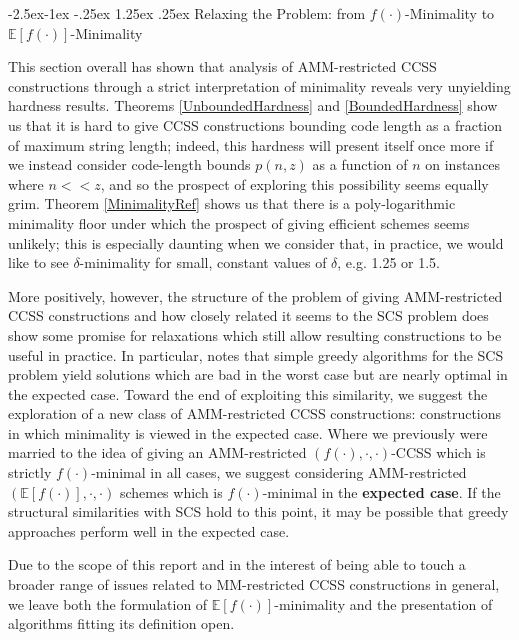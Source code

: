 \documentclass{article}
\makeatletter
\renewcommand\paragraph{\@startsection{paragraph}{4}{\z@}%
            {-2.5ex\@plus -1ex \@minus -.25ex}%
            {1.25ex \@plus .25ex}%
            {\normalfont\normalsize\bfseries}}
\theoremstyle{definition}
\makeatother
\begin{document}
\paragraph{Relaxing the Problem: from $f(\cdot)$-Minimality to $\mathbb{E}[f(\cdot)]$-Minimality}

This section overall has shown that analysis of AMM-restricted 
CCSS constructions through a strict interpretation of minimality 
reveals very unyielding hardness results.  Theorems \ref{UnboundedHardness}
and \ref{BoundedHardness} show us that it is hard to give CCSS constructions 
bounding code length as a fraction of maximum string length; indeed, this hardness
will present itself once more if we instead consider code-length bounds 
$p(n,z)$ as a function of $n$ on instances where $n << z$, and so the prospect of
exploring this possibility seems equally grim.  Theorem \ref{MinimalityRef} shows
us that there is a poly-logarithmic minimality floor under which the prospect of 
giving efficient schemes seems unlikely; this is especially daunting when we 
consider that, in practice, we would like to see $\delta$-minimality for small, constant 
values of $\delta$, e.g. 1.25 or 1.5.

More positively, however, the structure of the problem of giving AMM-restricted 
CCSS constructions and how closely related it seems to the SCS problem 
does show some promise for relaxations which still allow resulting 
constructions to be useful in practice.  In particular, \cite{SCSResults} notes 
that simple greedy algorithms for the SCS problem yield solutions which 
are bad in the worst case but are nearly optimal in the expected case.  Toward 
the end of exploiting this similarity, we suggest the exploration of a new class
of AMM-restricted CCSS constructions: constructions in which minimality is viewed 
in the expected case.  Where we previously were married to the idea of giving an 
AMM-restricted $(f(\cdot), \cdot, \cdot)$-CCSS which is strictly $f(\cdot)$-minimal 
in all cases, we suggest considering AMM-restricted $(\mathbb{E}[f(\cdot)], \cdot, \cdot)$ schemes which is $f(\cdot)$-minimal in the \textbf{expected case}.  If the 
structural similarities with SCS hold to this point, it may be possible that 
greedy approaches perform well in the expected case.

Due to the scope of this report and in the interest of being able to touch 
a broader range of issues related to MM-restricted CCSS constructions in 
general, we leave both the formulation of $\mathbb{E}[f(\cdot)]$-minimality 
and the presentation of algorithms fitting its definition open. 
\end{document}
